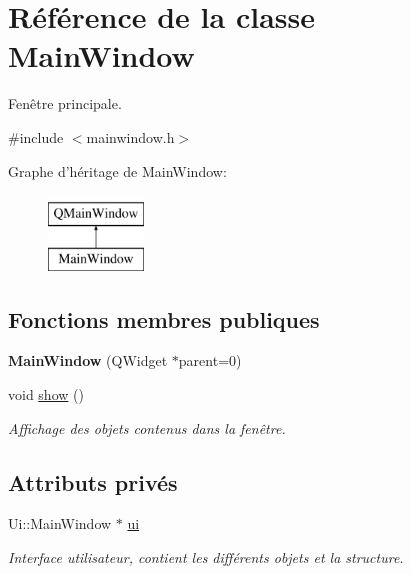 \hypertarget{classMainWindow}{\section{Référence de la classe Main\-Window}
\label{classMainWindow}
}


Fenêtre principale.  




{\ttfamily \#include $<$mainwindow.\-h$>$}

Graphe d'héritage de Main\-Window\-:\begin{figure}[H]
\begin{center}
\leavevmode
\includegraphics[height=2.000000cm]{classMainWindow}
\end{center}
\end{figure}
\subsection*{Fonctions membres publiques}
\begin{DoxyCompactItemize}
\item 
\hypertarget{classMainWindow_a8b244be8b7b7db1b08de2a2acb9409db}{{\bfseries Main\-Window} (Q\-Widget $\ast$parent=0)}\label{classMainWindow_a8b244be8b7b7db1b08de2a2acb9409db}

\item 
\hypertarget{classMainWindow_ae3d7a4598609a86e8bd317c0d85c4495}{void \hyperlink{classMainWindow_ae3d7a4598609a86e8bd317c0d85c4495}{show} ()}\label{classMainWindow_ae3d7a4598609a86e8bd317c0d85c4495}

\begin{DoxyCompactList}\small\item\em Affichage des objets contenus dans la fenêtre. \end{DoxyCompactList}\end{DoxyCompactItemize}
\subsection*{Attributs privés}
\begin{DoxyCompactItemize}
\item 
\hypertarget{classMainWindow_a35466a70ed47252a0191168126a352a5}{Ui\-::\-Main\-Window $\ast$ \hyperlink{classMainWindow_a35466a70ed47252a0191168126a352a5}{ui}}\label{classMainWindow_a35466a70ed47252a0191168126a352a5}

\begin{DoxyCompactList}\small\item\em Interface utilisateur, contient les différents objets et la structure. \end{DoxyCompactList}\end{DoxyCompactItemize}


